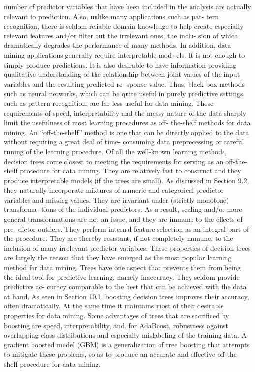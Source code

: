 number of predictor variables that have been included in the analysis are
actually relevant to prediction. Also, unlike many applications such as pat-
tern recognition, there is seldom reliable domain knowledge to help create
especially relevant features and/or filter out the irrelevant ones, the inclu-
sion of which dramatically degrades the performance of many methods.
In addition, data mining applications generally require interpretable mod-
els. It is not enough to simply produce predictions. It is also desirable to
have information providing qualitative understanding of the relationship
between joint values of the input variables and the resulting predicted re-
sponse value. Thus, black box methods such as neural networks, which can
be quite useful in purely predictive settings such as pattern recognition,
are far less useful for data mining.
These requirements of speed, interpretability and the messy nature of
the data sharply limit the usefulness of most learning procedures as off-
the-shelf methods for data mining. An “off-the-shelf” method is one that
can be directly applied to the data without requiring a great deal of time-
consuming data preprocessing or careful tuning of the learning procedure.
Of all the well-known learning methods, decision trees come closest to
meeting the requirements for serving as an off-the-shelf procedure for data
mining. They are relatively fast to construct and they produce interpretable
models (if the trees are small). As discussed in Section 9.2, they naturally
incorporate mixtures of numeric and categorical predictor variables and
missing values. They are invariant under (strictly monotone) transforma-
tions of the individual predictors. As a result, scaling and/or more general
transformations are not an issue, and they are immune to the effects of pre-
dictor outliers. They perform internal feature selection as an integral part
of the procedure. They are thereby resistant, if not completely immune,
to the inclusion of many irrelevant predictor variables. These properties of
decision trees are largely the reason that they have emerged as the most
popular learning method for data mining.
Trees have one aspect that prevents them from being the ideal tool for
predictive learning, namely inaccuracy. They seldom provide predictive ac-
curacy comparable to the best that can be achieved with the data at hand.
As seen in Section 10.1, boosting decision trees improves their accuracy,
often dramatically. At the same time it maintains most of their desirable
properties for data mining. Some advantages of trees that are sacrificed by
boosting are speed, interpretability, and, for AdaBoost, robustness against
overlapping class distributions and especially mislabeling of the training
data. A gradient boosted model (GBM) is a generalization of tree boosting
that attempts to mitigate these problems, so as to produce an accurate and
effective off-the-shelf procedure for data mining.

